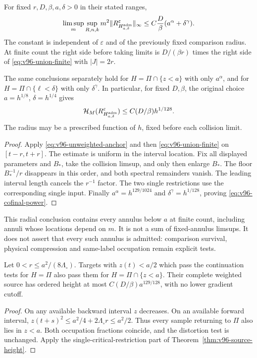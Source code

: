\begin{theorem}
\label{thm:v96-source-height}
For fixed $r,D,\beta,a,\delta>0$ in their stated ranges,
\begin{equation}\label{eq:v96-union-height}
 \limsup_m\sup_{R,n,k}m^2
 \|R_{H_{a,\delta}^{\rm adm}}^\varepsilon\|_\infty
       \le C\frac{D}{\beta}(a^\alpha+\delta^\gamma).
\end{equation}
The constant is independent of $\varepsilon$ and of the previously
fixed comparison radius. At finite count the right side before taking
limits is $D/(\beta r)$ times the right side of
\eqref{eq:v96-union-finite} with $|J|=2r$.

The same conclusions separately hold for $H=\Pi\cap\{z<a\}$
with only $a^\alpha$, and for $H=\Pi\cap\{\ell<\delta\}$
with only $\delta^\gamma$. In particular, for fixed $D,\beta$,
the original choice $a=h^{1/8}$, $\delta=h^{1/4}$ gives
\begin{equation}\label{eq:v96-cofinal-power}
 \mathcal H_M(R_{H_{a,\delta}^{\rm adm}}^\varepsilon)
                                    \le C(D/\beta)h^{1/128}.
\end{equation}
The radius may be a prescribed function of $h$, fixed before each
collision limit.
\end{theorem}
\begin{proof}
Apply \eqref{eq:v96-unweighted-anchor} and then
\eqref{eq:v96-union-finite} on $[t-r,t+r]$. The estimate is uniform
in the interval location. Fix all displayed parameters and $B_*$,
take the collision limsup, and only then enlarge $B_*$. The floor
$B_*^{-1}/r$ disappears in this order, and both spectral remainders
vanish. The leading interval length cancels the $r^{-1}$ factor.
The two single restrictions use the corresponding single input.
Finally $a^\alpha=h^{129/1024}$ and
$\delta^\gamma=h^{1/128}$, proving \eqref{eq:v96-cofinal-power}.
\end{proof}

This radial conclusion contains every annulus below $a$ at finite
count, including annuli whose locations depend on $m$. It is not a
sum of fixed-annulus limsups. It does not assert that every such
annulus is admitted: comparison survival, physical compression and
same-label occupation remain explicit tests.

\begin{corollary}
\label{cor:v96-inner-core}
Let $0<r\le a^2/(8\Lambda_\circ)$. Targets with $z(t)<a/2$
which pass the continuation tests for $H=\Pi$ also pass them for
$H=\Pi\cap\{z<a\}$. Their complete weighted source has ordered
height at most $C(D/\beta)a^{129/128}$, with no lower gradient cutoff.
\end{corollary}
\begin{proof}
On any available backward interval $z$ decreases. On an available
forward interval, $z(t+s)^2\le a^2/4+2\Lambda_\circ r\le a^2/2$.
Thus every sample returning to $\Pi$ also lies in $z<a$. Both
occupation fractions coincide, and the distortion test is unchanged.
Apply the single-critical-restriction part of
Theorem~\ref{thm:v96-source-height}.
\end{proof}

